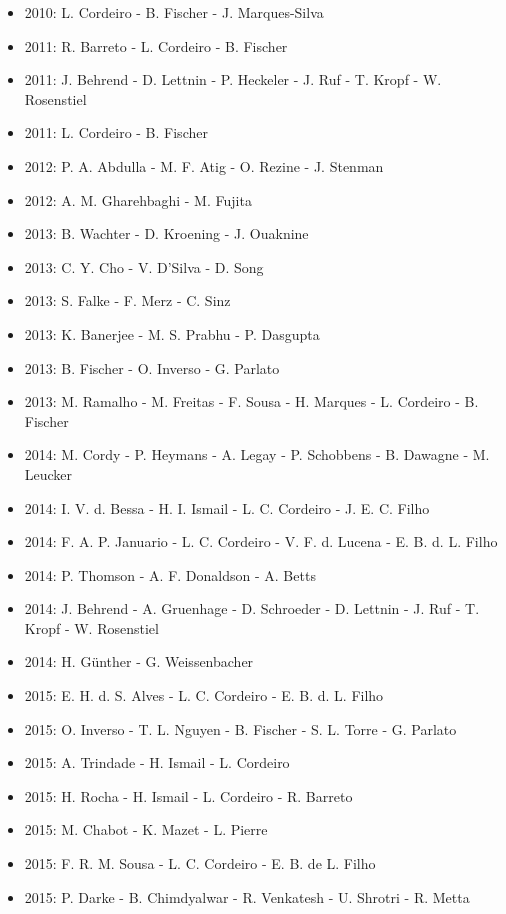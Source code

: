 \begin{itemize}
\item 2010: L. Cordeiro - B. Fischer - J. Marques-Silva
\item 2011: R. Barreto - L. Cordeiro - B. Fischer
\item 2011: J. Behrend - D. Lettnin - P. Heckeler - J. Ruf - T. Kropf - W. Rosenstiel
\item 2011: L. Cordeiro - B. Fischer
\item 2012: P. A. Abdulla - M. F. Atig - O. Rezine - J. Stenman
\item 2012: A. M. Gharehbaghi - M. Fujita
\item 2013: B. Wachter - D. Kroening - J. Ouaknine
\item 2013: C. Y. Cho - V. D'Silva - D. Song
\item 2013: S. Falke - F. Merz - C. Sinz
\item 2013: K. Banerjee - M. S. Prabhu - P. Dasgupta
\item 2013: B. Fischer - O. Inverso - G. Parlato
\item 2013: M. Ramalho - M. Freitas - F. Sousa - H. Marques - L. Cordeiro - B. Fischer
\item 2014: M. Cordy - P. Heymans - A. Legay - P. Schobbens - B. Dawagne - M. Leucker
\item 2014: I. V. d. Bessa - H. I. Ismail - L. C. Cordeiro - J. E. C. Filho
\item 2014: F. A. P. Januario - L. C. Cordeiro - V. F. d. Lucena - E. B. d. L. Filho
\item 2014: P. Thomson - A. F. Donaldson - A. Betts
\item 2014: J. Behrend - A. Gruenhage - D. Schroeder - D. Lettnin - J. Ruf - T. Kropf - W. Rosenstiel
\item 2014: H. G\"{u}nther - G. Weissenbacher
\item 2015: E. H. d. S. Alves - L. C. Cordeiro - E. B. d. L. Filho
\item 2015: O. Inverso - T. L. Nguyen - B. Fischer - S. L. Torre - G. Parlato
\item 2015: A. Trindade - H. Ismail - L. Cordeiro
\item 2015: H. Rocha - H. Ismail - L. Cordeiro - R. Barreto
\item 2015: M. Chabot - K. Mazet - L. Pierre
\item 2015: F. R. M. Sousa - L. C. Cordeiro - E. B. de L. Filho
\item 2015: P. Darke - B. Chimdyalwar - R. Venkatesh - U. Shrotri - R. Metta

\end{itemize}
